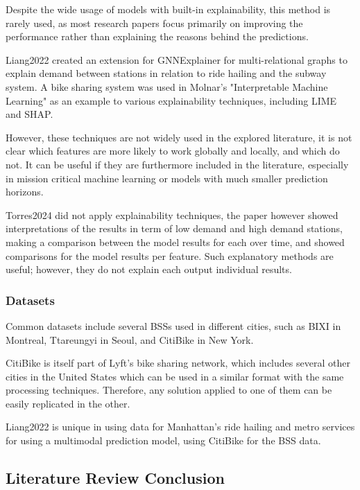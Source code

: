 \documentclass{article}
\begin{document}
Despite the wide usage of models with built-in explainability, this method is rarely used, as most research papers focus primarily on improving the performance rather than explaining the reasons behind the predictions.

Liang2022\cite{Liang2022} created an extension for GNNExplainer\cite{Ying2019} for multi-relational graphs to explain demand between stations in relation to ride hailing and the subway system. A bike sharing system was used in Molnar's "Interpretable Machine Learning"\cite{Molnar2020} as an example to various explainability techniques, including LIME\cite{Ribeiro2016} and SHAP\cite{Lundberg2017}.

However, these techniques are not widely used in the explored literature, it is not clear which features are more likely to work globally and locally, and which do not. It can be useful if they are furthermore included in the literature, especially in mission critical machine learning\cite{Hall2019} or models with much smaller prediction horizons.

Torres2024\cite{Torres2024} did not apply explainability techniques, the paper however showed interpretations of the results in term of low demand and high demand stations, making a comparison between the model results for each over time, and showed comparisons for the model results per feature. Such explanatory methods are useful; however, they do not explain each output individual results.

\subsubsection{Datasets}

Common datasets include several BSSs used in different cities, such as BIXI in Montreal\cite{Mehdi2022}, Ttareungyi in Seoul\cite{Seo2021}\cite{Cho2021}, and CitiBike in New York\cite{Liang2022}. 

CitiBike is itself part of Lyft's bike sharing network, which includes several other cities in the United States which can be used in a similar format with the same processing techniques\cite{LyftBikes}. Therefore, any solution applied to one of them can be easily replicated in the other.

Liang2022\cite{Liang2022} is unique in using data for Manhattan's ride hailing and metro services for using a multimodal prediction model, using CitiBike for the BSS data.

\subsection{Literature Review Conclusion}
\end{document}
